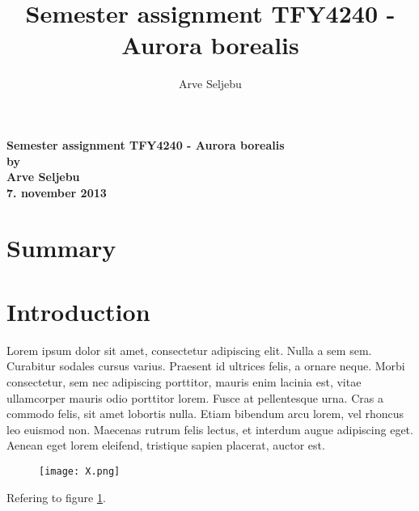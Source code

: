 \documentclass[11pt,a4paper]{article}
\begin{document}
\title{Semester assignment TFY4240 - Aurora borealis}
\author{Arve Seljebu}
\thispagestyle{empty}
\begin{center}
\vspace{5mm}
\LARGE
\textbf{Semester assignment TFY4240 - Aurora borealis} \\
\Large
\vspace{5mm}
\textbf{by} \\
\vspace{5mm}
\large
\textbf{Arve Seljebu} \\
\vspace{5mm}
\textbf{7. november 2013} \\
\vspace{20mm}
\end{center}
\newpage
\tableofcontents
\thispagestyle{empty}
\setcounter{tocdepth}{2}
\newpage

\section{Summary}

\section{Introduction}
Lorem ipsum dolor sit amet, consectetur adipiscing elit. Nulla a sem sem. Curabitur sodales cursus varius. Praesent id ultrices felis, a ornare neque. Morbi consectetur, sem nec adipiscing porttitor, mauris enim lacinia est, vitae ullamcorper mauris odio porttitor lorem. Fusce at pellentesque urna. Cras a commodo felis, sit amet lobortis nulla. Etiam bibendum arcu lorem, vel rhoncus leo euismod non. Maecenas rutrum felis lectus, et interdum augue adipiscing eget. Aenean eget lorem eleifend, tristique sapien placerat, auctor est.

\begin{center}
\begin{figure}[htbp] %
\label{figure.X}
\texttt{[image: X.png]}
\caption{}
\end{figure}
\end{center}

Refering to figure \ref{figure.X}.
\end{document}
